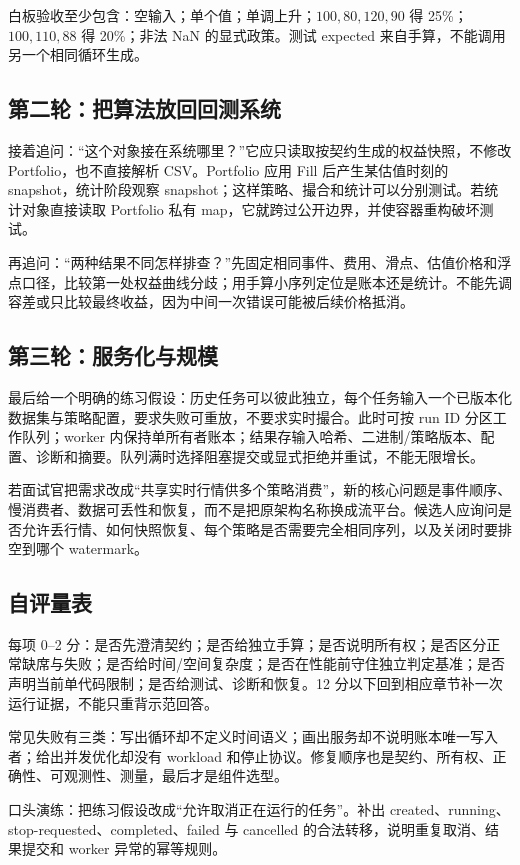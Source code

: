 白板验收至少包含：空输入；单个值；单调上升；\(100,80,120,90\) 得 25\%；\(100,110,88\) 得 20\%；非法 NaN 的显式政策。测试 expected 来自手算，不能调用另一个相同循环生成。

\subsection{第二轮：把算法放回回测系统}

接着追问：“这个对象接在系统哪里？”它应只读取按契约生成的权益快照，不修改 Portfolio，也不直接解析 CSV。Portfolio 应用 Fill 后产生某估值时刻的 snapshot，统计阶段观察 snapshot；这样策略、撮合和统计可以分别测试。若统计对象直接读取 Portfolio 私有 map，它就跨过公开边界，并使容器重构破坏测试。

再追问：“两种结果不同怎样排查？”先固定相同事件、费用、滑点、估值价格和浮点口径，比较第一处权益曲线分歧；用手算小序列定位是账本还是统计。不能先调容差或只比较最终收益，因为中间一次错误可能被后续价格抵消。

\subsection{第三轮：服务化与规模}

最后给一个明确的练习假设：历史任务可以彼此独立，每个任务输入一个已版本化数据集与策略配置，要求失败可重放，不要求实时撮合。此时可按 run ID 分区工作队列；worker 内保持单所有者账本；结果存输入哈希、二进制/策略版本、配置、诊断和摘要。队列满时选择阻塞提交或显式拒绝并重试，不能无限增长。

若面试官把需求改成“共享实时行情供多个策略消费”，新的核心问题是事件顺序、慢消费者、数据可丢性和恢复，而不是把原架构名称换成流平台。候选人应询问是否允许丢行情、如何快照恢复、每个策略是否需要完全相同序列，以及关闭时要排空到哪个 watermark。

\subsection{自评量表}

每项 0--2 分：是否先澄清契约；是否给独立手算；是否说明所有权；是否区分正常缺席与失败；是否给时间/空间复杂度；是否在性能前守住独立判定基准；是否声明当前单代码限制；是否给测试、诊断和恢复。12 分以下回到相应章节补一次运行证据，不能只重背示范回答。

常见失败有三类：写出循环却不定义时间语义；画出服务却不说明账本唯一写入者；给出并发优化却没有 workload 和停止协议。修复顺序也是契约、所有权、正确性、可观测性、测量，最后才是组件选型。

口头演练：把练习假设改成“允许取消正在运行的任务”。补出 created、running、stop-requested、completed、failed 与 cancelled 的合法转移，说明重复取消、结果提交和 worker 异常的幂等规则。

